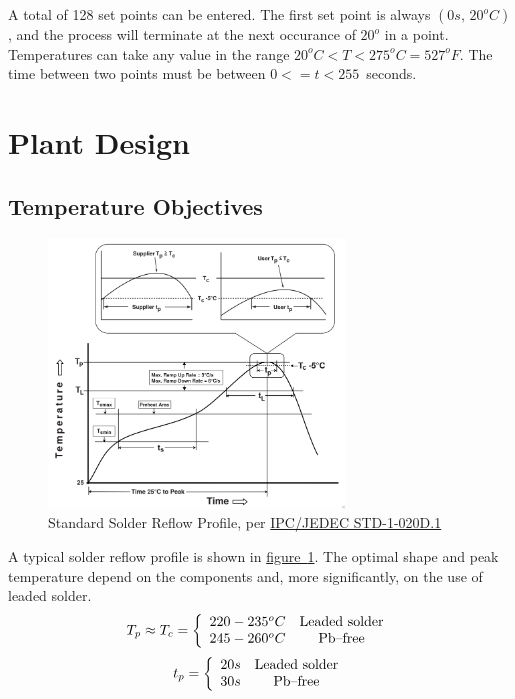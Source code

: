\documentclass[10pt, twocolumn]{article}
\begin{document}
A total of 128 set points can be entered. The first set point is always $(0s,\,20^{o}C)$,
and the process will terminate at the next occurance of $20^{o}$ in a point.
Temperatures can take any value in the range \mbox{$20^{o}C<T<275^{o}C=527^{o}F$.}
The time between two points must be between \mbox{$0<=t<255$ seconds.}

\section{Plant Design}

\subsection{Temperature Objectives}

\begin{figure}
	\centering
	\includegraphics[width=0.7\textwidth]{Figures/standard-reflow-profile.pdf}
	\caption{Standard Solder Reflow Profile, per \href{J-STD-020D-1.pdf}{IPC/JEDEC STD-1-020D.1}}
	\label{standard-reflow-profile}
\end{figure}

A typical solder reflow profile is shown in
\hyperref[standard-reflow-profile]{\mbox{figure \ref{standard-reflow-profile}}}.
The optimal shape and peak temperature depend on the components and,
more significantly, on the use of leaded solder.
\begin{equation*}
T_{p}\approx T_{c}=\left\{\begin{array}{c c}
220-235^{o}C	&\textrm{Leaded solder}	\\
245-260^{o}C	&\textrm{Pb--free}	\\
\end{array}\right.
\end{equation*}
\begin{equation*}
t_{p}=\left\{\begin{array}{c c}
20s	&\textrm{Leaded solder}	\\
30s	&\textrm{Pb--free}	\\
\end{array}\right.
\end{equation*}
\end{document}
